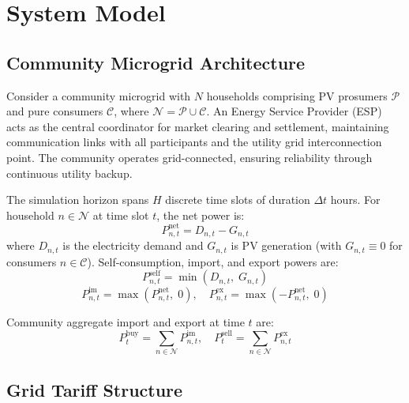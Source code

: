 \documentclass[pdflatex,sn-mathphys-num]{sn-jnl}
\theoremstyle{thmstyleone}
\theoremstyle{thmstyletwo}
\begin{document}
\section{System Model}\label{sec:system}

\subsection{Community Microgrid Architecture}

Consider a community microgrid with $N$ households comprising PV prosumers $\mathcal{P}$ and pure consumers $\mathcal{C}$, where $\mathcal{N} = \mathcal{P} \cup \mathcal{C}$. An Energy Service Provider (ESP) acts as the central coordinator for market clearing and settlement, maintaining communication links with all participants and the utility grid interconnection point. The community operates grid-connected, ensuring reliability through continuous utility backup.

The simulation horizon spans $H$ discrete time slots of duration $\Delta t$ hours. For household $n \in \mathcal{N}$ at time slot $t$, the net power is:
\begin{equation}
    P_{n,t}^{\text{net}} = D_{n,t} - G_{n,t}
    \label{eq:net_power}
\end{equation}
where $D_{n,t}$ is the electricity demand and $G_{n,t}$ is PV generation (with $G_{n,t} \equiv 0$ for consumers $n \in \mathcal{C}$). Self-consumption, import, and export powers are:
\begin{equation}
    P_{n,t}^{\text{self}} = \min(D_{n,t},\; G_{n,t})
    \label{eq:self_consumption}
\end{equation}
\begin{equation}
    P_{n,t}^{\text{im}} = \max(P_{n,t}^{\text{net}},\; 0), \quad P_{n,t}^{\text{ex}} = \max(-P_{n,t}^{\text{net}},\; 0)
    \label{eq:import_export}
\end{equation}

Community aggregate import and export at time $t$ are:
\begin{equation}
    P_t^{\text{buy}} = \sum_{n \in \mathcal{N}} P_{n,t}^{\text{im}}, \quad P_t^{\text{sell}} = \sum_{n \in \mathcal{N}} P_{n,t}^{\text{ex}}
    \label{eq:community_aggregate}
\end{equation}

\subsection{Grid Tariff Structure}
\end{document}
